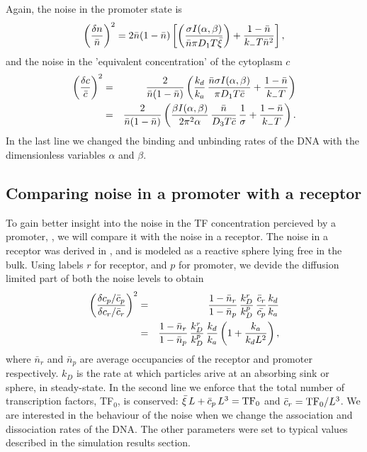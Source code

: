 Again, the noise in the promoter state is
\begin{equation}
 \elabel{NoiseProFull}
 \left( \frac{\delta n}{\bar{n}} \right)^2 = 2 \bar{n}(1-\bar{n})\left[\left( \frac{\sigma I(\alpha,\beta)}{\bar{n} \pi D_1 T \bar{\xi}} \right)+\frac{1-\bar{n}}{k_- T \bar{n}^2} \right],
\end{equation}
and the noise in the 'equivalent concentration' of the cytoplasm $c$
\begin{eqnarray}
 \elabel{NoiseCFull} 
 \left( \frac{\delta c}{\bar{c}} \right)^2 & = & \frac{2}{\bar{n}(1-\bar{n})} \left( \frac{k_d}{k_a} \, \frac{\bar{n} \sigma I(\alpha,\beta)}{\pi D_1 T \bar{c}} + \frac{1-\bar{n}}{k_- T}  \right) \\
 \elabel{NoiseCFull2}
 & = & \frac{2}{\bar{n}(1-\bar{n})} \left( \frac{\beta I(\alpha,\beta)}{2 \pi^2 \alpha} \, \frac{\bar{n}}{D_3 T \bar{c}} \, \frac{1}{\sigma} + \frac{1-\bar{n}}{k_- T}  \right).
\end{eqnarray}
In the last line we changed the binding and unbinding rates of the DNA with the dimensionless variables $\alpha$ and $\beta$.


\subsection{Comparing noise in a promoter with a receptor}
To gain better insight into the noise in the TF concentration percieved by a promoter, , we will compare it with the noise in a receptor. The noise in a receptor was derived in \cite{DeRonde2012}, and is modeled as a reactive sphere lying free in the bulk. Using labels $r$ for receptor, and $p$ for promoter, we devide the diffusion limited part of both the noise levels to obtain
\begin{eqnarray}
 \left( \frac{\delta c_p / \bar{c}_p}{\delta c_r / \bar{c}_r} \right)^2 & = & \frac{1-\bar{n}_r}{1-\bar{n}_p} \, \frac{k_D^r}{k_D^p} \, \frac{\bar{c}_r}{\bar{c_p}} \frac{k_d}{k_a} \\
 & = & \frac{1-\bar{n}_r}{1-\bar{n}_p} \, \frac{k_D^r}{k_D^p} \, \frac{k_d}{k_a} \left( 1 + \frac{k_a}{k_d L^2}\right),
 \elabel{NoiseCmpA}
\end{eqnarray}
where $\bar{n}_r$ and $\bar{n}_p$ are average occupancies of the receptor and promoter respectively. $k_D$ is the rate at which particles arive at an absorbing sink or sphere, in steady-state. In the second line we enforce that the total number of transcription factors, TF$_0$, is conserved: $\bar{\xi} \, L + \bar{c}_p \, L^3 = {\rm TF}_0$ and $\bar{c}_r = {\rm TF}_0/L^3$. We are interested in the behaviour of the noise when we change the association and dissociation rates of the DNA. The other parameters were set to typical values described in the simulation results section. 

